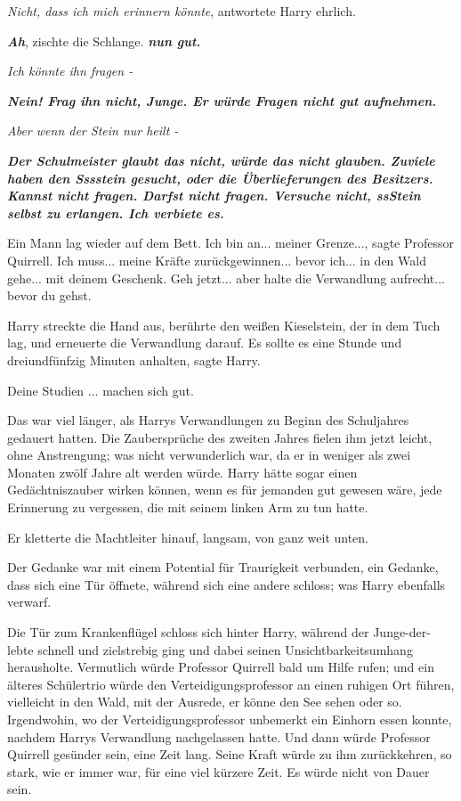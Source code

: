\glqq{}\emph{Nicht, dass ich mich erinnern könnte}\grqq{}, antwortete Harry
ehrlich.

\glqq{}\textbf{\emph{Ah}}\grqq{}, zischte die Schlange. \glqq{}\textbf{\emph{nun
gut.}}\grqq{}

\glqq{}\emph{Ich könnte ihn fragen -}\grqq{}

\glqq{}\textbf{\emph{Nein! Frag ihn nicht, Junge. Er würde Fragen nicht gut
aufnehmen.}}\grqq{}

\glqq{}\emph{Aber wenn der Stein nur heilt -}\grqq{}

\glqq{}\textbf{\emph{Der Schulmeister glaubt das nicht, würde das nicht glauben.
Zuviele haben den Sssstein gesucht, oder die Überlieferungen des Besitzers.
Kannst nicht fragen. Darfst nicht fragen. Versuche nicht, ssStein selbst zu
erlangen. Ich verbiete es.}}\grqq{}

Ein Mann lag wieder auf dem Bett. \glqq{}Ich bin an... meiner Grenze...\grqq{},
sagte Professor Quirrell. \glqq{}Ich muss... meine Kräfte zurückgewinnen... bevor
ich... in den Wald gehe... mit deinem Geschenk. Geh jetzt... aber halte die
Verwandlung aufrecht... bevor du gehst.\grqq{}

Harry streckte die Hand aus, berührte den weißen Kieselstein, der in dem Tuch
lag, und erneuerte die Verwandlung darauf. \glqq{}Es sollte es eine Stunde und
dreiundfünfzig Minuten anhalten\grqq{}, sagte Harry.

\glqq{}Deine Studien ... machen sich gut.\grqq{}

Das war viel länger, als Harrys Verwandlungen zu Beginn des Schuljahres gedauert
hatten. Die Zaubersprüche des zweiten Jahres fielen ihm jetzt leicht, ohne
Anstrengung; was nicht verwunderlich war, da er in weniger als zwei Monaten
zwölf Jahre alt werden würde. Harry hätte sogar einen Gedächtniszauber wirken
können, wenn es für jemanden gut gewesen wäre, jede Erinnerung zu vergessen, die
mit seinem linken Arm zu tun hatte.

Er kletterte die Machtleiter hinauf, langsam, von ganz weit unten.

Der Gedanke war mit einem Potential für Traurigkeit verbunden, ein Gedanke, dass
sich eine Tür öffnete, während sich eine andere schloss; was Harry ebenfalls
verwarf.

Die Tür zum Krankenflügel schloss sich hinter Harry, während der Junge-der-lebte
schnell und zielstrebig ging und dabei seinen Unsichtbarkeitsumhang herausholte.
Vermutlich würde Professor Quirrell bald um Hilfe rufen; und ein älteres
Schülertrio würde den Verteidigungsprofessor an einen ruhigen Ort führen,
vielleicht in den Wald, mit der Ausrede, er könne den See sehen oder so.
Irgendwohin, wo der Verteidigungsprofessor unbemerkt ein Einhorn essen konnte,
nachdem Harrys Verwandlung nachgelassen hatte. Und dann würde Professor Quirrell
gesünder sein, eine Zeit lang. Seine Kraft würde zu ihm zurückkehren, so stark,
wie er immer war, für eine viel kürzere Zeit. Es würde nicht von Dauer sein.

